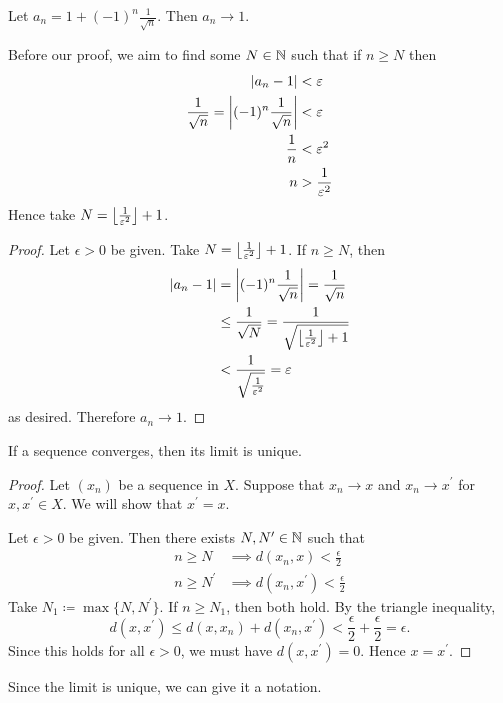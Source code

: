 \begin{example}
Let $a_n=1+(-1)^n\frac{1}{\sqrt{n}}$. Then $a_n\to 1$.

Before our proof, we aim to find some $N\in\mathbb N$ such that if $n\ge N$ then
\begin{align*}
|a_n-1|&<\varepsilon\\
\frac{1}{\sqrt{n}}=\left|(-1)^n\frac{1}{\sqrt{n}}\right|&<\varepsilon\\
\frac{1}{n}&<\varepsilon^2\\
n&>\frac{1}{\varepsilon^2}
\end{align*}
Hence take $N=\left\lfloor \frac{1}{\varepsilon^2} \right\rfloor+1$.

\begin{proof}
Let $\epsilon>0$ be given. Take $N=\left\lfloor \frac{1}{\varepsilon^2} \right\rfloor+1$. If $n\ge N$, then
\begin{align*}
|a_n-1|&=\left|(-1)^n\frac{1}{\sqrt{n}}\right|=\frac{1}{\sqrt{n}}\\
&\le\frac{1}{\sqrt{N}}=\frac{1}{\sqrt{\left\lfloor \frac{1}{\varepsilon^2} \right\rfloor+1}}\\
&<\frac{1}{\sqrt{\frac{1}{\varepsilon^2}}}=\varepsilon
\end{align*}
as desired. Therefore $a_n\to1$.
\end{proof}
\end{example}

\begin{lemma}
If a sequence converges, then its limit is unique.
\end{lemma}

\begin{proof}
Let $(x_n)$ be a sequence in $X$. Suppose that $x_n\to x$ and $x_n\to x^\prime$ for $x,x^\prime\in X$. We will show that $x^\prime=x$.

Let $\epsilon>0$ be given. Then there exists $N,N^\prime\in\mathbb N$ such that
\begin{align*}
n\ge N&\implies d(x_n,x)<\frac{\epsilon}{2}\\
n\ge N^\prime&\implies d(x_n,x^\prime)<\frac{\epsilon}{2}
\end{align*}
Take $N_1\coloneqq\max\{N,N^\prime\}$. If $n\ge N_1$, then both hold. By the triangle inequality,
\[d(x,x^\prime)\le d(x,x_n)+d(x_n,x^\prime)<\frac{\epsilon}{2}+\frac{\epsilon}{2}=\epsilon.\]
Since this holds for all $\epsilon>0$, we must have $d(x,x^\prime)=0$. Hence $x=x^\prime$.
\end{proof}

Since the limit is unique, we can give it a notation.

